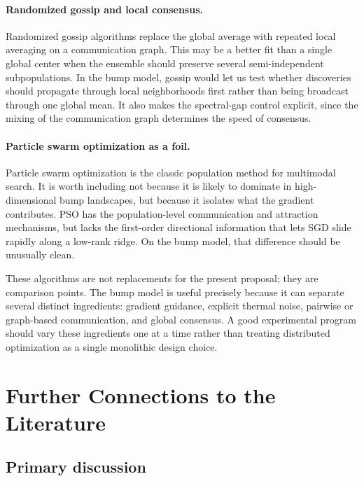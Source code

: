 \documentclass{article}
\begin{document}
\paragraph{Randomized gossip and local consensus.}
Randomized gossip algorithms \cite{boyd2006randomized} replace the
global average with repeated local averaging on a communication graph.
This may be a better fit than a single global center when the ensemble
should preserve several semi-independent subpopulations. In the bump
model, gossip would let us test whether discoveries should propagate
through local neighborhoods first rather than being broadcast through one
global mean. It also makes the spectral-gap control explicit, since the
mixing of the communication graph determines the speed of consensus.

\paragraph{Particle swarm optimization as a foil.}
Particle swarm optimization \cite{kennedy1995particle} is the classic
population method for multimodal search. It is worth including not
because it is likely to dominate in high-dimensional bump landscapes,
but because it isolates what the gradient contributes. PSO has the
population-level communication and attraction mechanisms, but lacks the
first-order directional information that lets SGD slide rapidly along a
low-rank ridge. On the bump model, that difference should be unusually
clean.

These algorithms are not replacements for the present proposal; they are
comparison points. The bump model is useful precisely because it can
separate several distinct ingredients: gradient guidance, explicit
thermal noise, pairwise or graph-based communication, and global
consensus. A good experimental program should vary these ingredients one
at a time rather than treating distributed optimization as a single
monolithic design choice.

\section{Further Connections to the Literature}

\subsection*{Primary discussion}
\end{document}
